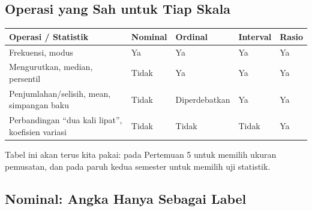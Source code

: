 \documentclass[
  indonesian,
  letterpaper,
]{book}
\newcounter{none} %
\begin{document}
\subsection{Operasi yang Sah untuk Tiap
Skala}\label{operasi-yang-sah-untuk-tiap-skala}

{\def\LTcaptype{none} %
\begin{longtable}[]{@{}
  >{\raggedright\arraybackslash}p{}
  >{\centering\arraybackslash}p{}
  >{\centering\arraybackslash}p{}
  >{\centering\arraybackslash}p{}
  >{\centering\arraybackslash}p{}@{}}
\toprule\noalign{}
\begin{minipage}[b]{\linewidth}\raggedright
Operasi / Statistik
\end{minipage} & \begin{minipage}[b]{\linewidth}\centering
Nominal
\end{minipage} & \begin{minipage}[b]{\linewidth}\centering
Ordinal
\end{minipage} & \begin{minipage}[b]{\linewidth}\centering
Interval
\end{minipage} & \begin{minipage}[b]{\linewidth}\centering
Rasio
\end{minipage} \\
\midrule\noalign{}
\endhead
\bottomrule\noalign{}
\endlastfoot
Frekuensi, modus & Ya & Ya & Ya & Ya \\
Mengurutkan, median, persentil & Tidak & Ya & Ya & Ya \\
Penjumlahan/selisih, mean, simpangan baku & Tidak & Diperdebatkan & Ya &
Ya \\
Perbandingan ``dua kali lipat'', koefisien variasi & Tidak & Tidak &
Tidak & Ya \\
\end{longtable}
}

Tabel ini akan terus kita pakai: pada Pertemuan 5 untuk memilih ukuran
pemusatan, dan pada paruh kedua semester untuk memilih uji statistik.

\subsection{Nominal: Angka Hanya Sebagai
Label}\label{nominal-angka-hanya-sebagai-label}
\end{document}
